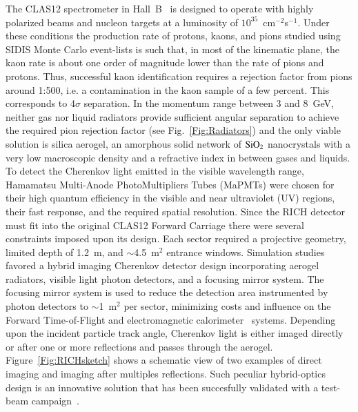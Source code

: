 \documentclass[5p,times,twocolumn]{elsarticle}
\begin{document}
The CLAS12 spectrometer in Hall~B~\cite{REF:overview-nim} is designed to operate with highly polarized beams and
nucleon targets at a luminosity of $10^{35}$~cm$^{-2}$s$^{-1}$. Under these conditions the production rate of protons,
kaons, and pions studied using SIDIS Monte Carlo event-lists is such that, in most of the kinematic plane, the kaon rate
is about one order of magnitude lower than the rate of pions and protons. Thus, successful kaon identification requires
a rejection factor from pions around 1:500, i.e. a contamination in the kaon sample of a few percent. This corresponds to
4$\sigma$ separation. In the momentum range between 3 and 8~GeV, neither gas nor liquid radiators provide sufficient
angular separation to achieve the required pion rejection factor (see Fig.~\ref{Fig:Radiators}) and the only viable
solution is silica aerogel, an amorphous solid network of $\rm SiO_2$ nanocrystals with a very low macroscopic density
and a refractive index in between gases and liquids. To detect the Cherenkov light emitted in the visible wavelength
range, Hamamatsu Multi-Anode PhotoMultipliers Tubes (MaPMTs) were chosen for their high quantum efficiency in the
visible and near ultraviolet (UV) regions, their fast response, and the required spatial resolution. Since the RICH
detector must fit into the original CLAS12 Forward Carriage there were several constraints imposed upon its design.
Each sector required a projective geometry, limited depth of 1.2~m, and $\sim$4.5~m$^2$ entrance windows.
Simulation studies favored a hybrid imaging Cherenkov detector design incorporating aerogel radiators, visible light
photon detectors, and a focusing mirror system. The focusing mirror system is used to reduce the detection area
instrumented by photon detectors to $\sim$1~m$^2$ per sector, minimizing costs and influence on the Forward
Time-of-Flight and electromagnetic calorimeter~\cite{REF:ecal-nim} systems. Depending upon the incident particle track
angle, Cherenkov light is either imaged directly or after one or more reflections and passes through the aerogel.
Figure~\ref{Fig:RICHsketch} shows a schematic view of two examples of direct imaging and imaging after multiples
reflections. Such peculiar hybrid-optics design is an innovative solution that has been succesfully validated with 
a test-beam campaign~\cite{REF:RICH2013}. 
\end{document}
